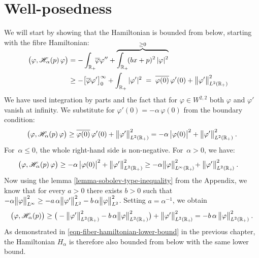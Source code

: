 \section{Well-posedness}
We will start by showing that the Hamiltonian is bounded from below, starting with the fibre Hamiltonian:
\begin{align*}
    \\[-2\baselineskip]
    \big( \varphi, \mathscr{H}_\alpha(p) \, \varphi \big)
    &= - \int_{\mathbb{R}_+} \!\! \overline\varphi \varphi''
    + \overbrace{\int_{\mathbb{R}_+} \! (bx + p)^2 \, |\varphi|^2}^{\geq 0}
    \\
    &\geq -\big[ \overline\varphi \varphi' \big]_0^{\infty}
    + \int_{\mathbb{R}_+} |\varphi'|^2
    \;=\;
    \overline{ \varphi(0) } \, \varphi'(0)
    + \big\lVert  \varphi'  \big\rVert_{L^2(\mathbb{R}_+)}^2
\end{align*}
We have used integration by parts and the fact that for $\varphi \in W^{2,2}$ both $\varphi$ and $\varphi'$ vanish at infinity. We substitute for $\varphi'(0) = -\alpha \, \varphi(0)$ from the boundary condition:
\begin{align*}
    \big( \varphi, \mathscr{H}_\alpha(p) \, \varphi \big)
    \geq \overline{ \varphi(0) } \, \varphi'(0)
    + \big\lVert  \varphi'  \big\rVert_{L^2(\mathbb{R}_+)}^2
    = - \alpha \, \big| \varphi(0) \big|^2
    + \big\lVert  \varphi'  \big\rVert_{L^2(\mathbb{R}_+)}^2
    \: .
\end{align*}
For~$\alpha \leq 0$, the whole right-hand side is non-negative. For~$\alpha > 0$, we have:
\begin{align*}
    &\big( \varphi, \mathscr{H}_\alpha(p) \, \varphi \big)
    \geq - \alpha \, \big| \varphi(0) \big|^2
    + \big\lVert  \varphi'  \big\rVert_{L^2(\mathbb{R}_+)}^2
    \geq -\alpha \big\lVert \varphi \big\rVert_{L^{\!\infty}(\mathbb{R}_+\!)}^2
    \! + \big\lVert  \varphi'  \big\rVert_{L^2(\mathbb{R}_+\!)}^2
    \: .
\end{align*}
Now using the lemma \ref{lemma-sobolev-type-inequality} from the Appendix, we know that for every $a>0$ there exists $b>0$ such that $-\alpha \big\lVert \varphi \big\rVert_{L^{\!\infty}}^2 \geq -a \, \alpha \big\lVert \varphi' \big\rVert_{L^2}^2 - b \, \alpha \big\lVert \varphi \big\rVert_{L^2}^2$. Setting $a = \alpha^{-1}$, we obtain
\begin{equation*}
    \big( \varphi, \mathscr{H}_\alpha(p) \big)
    \geq \big(
        -\big\lVert \varphi' \big\rVert_{L^2(\mathbb{R}_+)}^2
        - b \, \alpha \big\lVert \varphi \big\rVert_{L^2(\mathbb{R}_+)}^2
    \big)
     + \big\lVert  \varphi'  \big\rVert_{L^2(\mathbb{R}_+\!)}^2
    =
    - b \, \alpha \,
    \big\lVert \varphi \big\rVert_{L^2(\mathbb{R}_+)}^2
    \: .
\end{equation*}
As demonstrated in \eqref{eqn-fiber-hamiltonian-lower-bound} in the previous chapter, the Hamiltonian $H_\alpha$ is therefore also bounded from below with the same lower bound.

